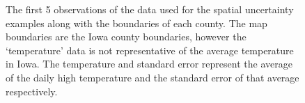 \documentclass[
  12pt]{article}
\begin{document}
\begin{figure}

\begin{minipage}{0.50\linewidth}



\end{minipage}%
%
\begin{minipage}{0.50\linewidth}



\end{minipage}%

\caption{\label{fig-data}The first 5 observations of the data used for
the spatial uncertainty examples along with the boundaries of each
county. The map boundaries are the Iowa county boundaries, however the
`temperature' data is not representative of the average temperature in
Iowa. The temperature and standard error represent the average of the
daily high temperature and the standard error of that average
respectively.}

\end{figure}%
\end{document}
